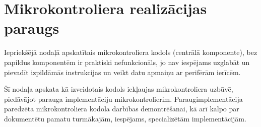 \section{Mikrokontroliera realizācijas paraugs} \label{sec:uC}
	Iepriekšējā nodaļā apskatītais mikrokontroliera kodols (centrālā
	komponente), bez papildus komponentēm ir praktiski nefunkcionāls, jo
	nav iespējams uzglabāt un pievadīt izpildāmās instrukcijas un veikt
	datu apmaiņu ar perifērām ierīcēm.
	
	
	Šī nodaļa apskata kā izveidotais kodols iekļaujas
	mikrokontroliera uzbūvē, piedāvājot	parauga implementāciju
	mikrokontrolierim. 
	Paraug\-implementācija paredzēta mikrokontroliera kodola 
	darbības demontrēšanai, kā arī kalpo par dokumentētu pamatu 
	turmākajām, iespējams, specializētām implementācijām.
	
	
	 \pagebreak[3]
	
